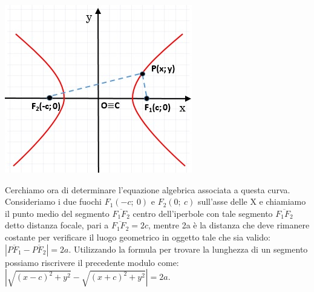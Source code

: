   \begin{minipage}[c]{.2\textwidth}
    \includegraphics[width=\textwidth]{img/iperbol2.jpg}
  \end{minipage}
  \hspace{.5cm}
  \begin{minipage}[c]{.75\textwidth}
Cerchiamo ora di determinare l'equazione algebrica associata a 
questa curva.
Consideriamo i due fuochi $ F_{1}(-c;~0)$ e $ F_{2}(0;~c)$ sull'asse 
delle X e chiamiamo il punto medio del segmento $\overline{F_{1}F_{2}}$ 
centro dell'iperbole con tale segmento $\overline{F_{1}F_{2}}$  detto 
distanza focale, pari a $\overline{F_{1}F_{2}} =2c$, mentre 2a è la 
distanza che deve rimanere costante per verificare il luogo geometrico in 
oggetto tale che sia valido: 
$\left|\overline{PF_{1}}-\overline{PF_{2}}\right|=2a$. 
  Utilizzando la formula per trovare la lunghezza di un segmento 
possiamo riscrivere il precedente modulo come:
    $\left|\sqrt{(x-c)^{2}+y^{2}} -\sqrt{(x+c)^{2}+y^{2}}\right|=2a$.
  \end{minipage}

